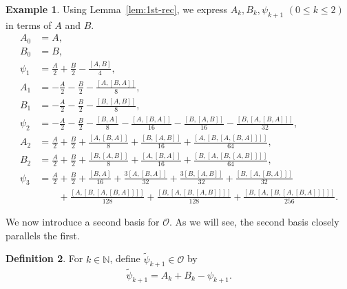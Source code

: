\documentclass[11pt]{article}%
\theoremstyle{definition}
\newtheorem{definition}{Definition}[section]
\newtheorem{example}[definition]{Example}
\theoremstyle{plain}
\begin{document}
\begin{example}
Using Lemma~\ref{lem:1st-rec}, we express $A_k, B_k, \psi_{k+1}$ $(0 \leq k \leq 2)$ in terms of $A$ and $B$.
\begin{align*}
	A_0 & = A,\\
	B_0 & = B, \\
	\psi_{1} & = \frac{A}{2} + \frac{B}{2} - \frac{[A,B]}{4}, \\[2pt]
	A_{1} & = -\frac{A}{2} -\frac{B}{2} - \frac{[A,[B,A]]}{8}, \\[2pt]
	B_{1} & = -\frac{A}{2} -\frac{B}{2} - \frac{[B,[A,B]]}{8}, \\[2pt]
	\psi_{2} & = -\frac{A}{2} - \frac{B}{2} - \frac{[B,A]}{8} - \frac{[A, [B, A]]}{16} - \frac{[B,[A,B]]}{16} - \frac{[B, [A, [B, A]]]}{32}, \\[2pt]
	A_{2} & = \frac{A}{2} + \frac{B}{2} + \frac{[A, [B, A]]}{8} + \frac{[B, [A, B]]}{16} + \frac{[A, [B, [A, [B, A]]]]}{64}, \\[2pt]
	B_{2} & = \frac{A}{2} + \frac{B}{2} + \frac{[B, [A, B]]}{8} + \frac{[A, [B, A]]}{16} + \frac{[B, [A, [B, [A, B]]]]}{64},\\[2pt]
	\psi_{3} & = \frac{A}{2} + \frac{B}{2} + \frac{[B,A]}{16} + \frac{3[A,[B,A]]}{32} + \frac{3[B,[A,B]]}{32} + \frac{[B, [A,[B,A]]]}{32} \\[2pt]
	& \qquad + \frac{[A,[B,[A,[B,A]]]]}{128}  + \frac{[B,[A,[B,[A,B]]]]}{128} + \frac{[B,[A,[B,[A,[B,A]]]]]}{256}.
\end{align*}
\end{example}


We now introduce a second basis for $\mathcal{O}$.
As we will see, the second basis closely parallels the first.

\begin{definition}\label{def:tilde psi_i}
For $k \in \mathbb{N}$, define $\tilde \psi_{k+1} \in \mathcal{O}$ by
\begin{equation}\label{eq:tilde psi_i}
	\tilde\psi_{k+1} = A_k + B_k - \psi_{k+1}.
\end{equation}
\end{definition}
\end{document}
